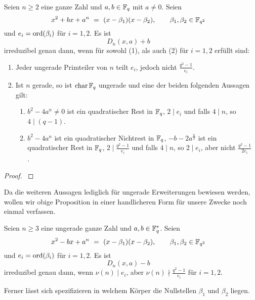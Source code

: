 \begin{proposition}
  \label{satz:dickson_irred}
  Seien $n\geq 2$ eine ganze Zahl und $a,b \in \mathbb{F}_q$ mit $a \neq 0$.
  Seien
  \[ x^2 + bx +a^n \ =\  (x-\beta_1)(x-\beta_2), \qquad 
    \beta_1,\beta_2 \in \mathbb{F}_{q^2}\]
  und $e_i = \operatorname{ord}(\beta_i)$ für $i=1,2$. Es ist
  \[ D_n(x,a) + b \]
  irreduzibel genau dann, wenn für sowohl (1), als auch (2) für $i=1,2$ erfüllt
  sind:
  \begin{enumerate}
    \item Jeder ungerade Primteiler von $n$ teilt $e_i$, jedoch nicht
      $\tfrac{q^2-1}{e_i}$.
    \item Ist $n$ gerade, so ist $\operatorname{char} \mathbb{F}_q$ ungerade und eine der beiden
      folgenden Aussagen gilt:
      \begin{enumerate}[label=(\arabic*')]
        \item $b^2-4a^n \neq 0$ ist ein quadratischer Rest in $\mathbb{F}_q$, $2\mid e_i$
          und falls $4\mid n$, so $4 \mid (q-1)$.
        \item $b^2-4a^n$ ist ein quadratischer Nichtrest in $\mathbb{F}_q$,
          $-b-2a^\frac n 2$ ist ein quadratischer Rest in $\mathbb{F}_q$, 
          $2 \mid \tfrac{q^2-1}{e_i}$ und falls $4\mid n$, so $2\mid e_i$, 
          aber nicht $\tfrac{q^2-1}{2e_i}$.
      \end{enumerate}
  \end{enumerate}
\end{proposition}
\begin{proof}
  \autocite[Theorem 4]{gao1994}
\end{proof}

Da die weiteren Aussagen lediglich für ungerade Erweiterungen bewiesen werden,
wollen wir obige Proposition in einer handlicheren Form für unsere Zwecke 
noch einmal verfassen.

\begin{kor}
  \label{kor:dickson_irred}
  Seien $n\geq 3$ eine ungerade ganze Zahl und $a,b\in \mathbb{F}_q^\ast$. Seien
  \[ x^2 - bx +a^n \ =\  (x-\beta_1)(x-\beta_2), \qquad 
    \beta_1,\beta_2 \in \mathbb{F}_{q^2}\]
  und $e_i = \operatorname{ord}(\beta_i)$ für $i=1,2$. Es ist
  \[ D_n(x,a) - b \]
  irreduzibel genau dann, wenn $\nu(n)\mid e_i$, aber 
  $\nu(n)\nmid \tfrac{q^2-1}{e_i}$ für $i=1,2$.
\end{kor}

Ferner lässt sich spezifizieren in welchem Körper die Nullstellen $\beta_1$ 
und $\beta_2$ liegen.

